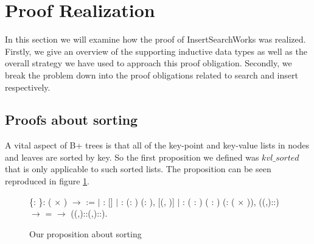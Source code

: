 \section{Proof Realization}
\label{sec:ProofRealization}
In this section we will examine how the proof of InsertSearchWorks was realized. Firstly, we give an overview of the supporting inductive data types as well as the overall strategy we have used to approach this proof obligation. Secondly, we break the problem down into the proof obligations related to search and insert respectively. 

\subsection{Proofs about sorting}
A vital aspect of B+ trees is that all of the key-point and key-value lists in nodes and leaves are sorted by key. So the first proposition we defined was $kvl\_sorted$ that is only applicable to such sorted lists. The proposition can be seen reproduced in figure \ref{fig:kvl_sorted}.

\begin{figure}
  \begin{coqdoccode}
  \coqdocnoindent
    \{: \}:  ( \ensuremath{\times} ) \ensuremath{\rightarrow}  :=\coqdoceol
  \coqdocindent{1.00em}
  \ensuremath{|}
  :  []\coqdoceol
  \coqdocindent{1.00em}
  \ensuremath{|} : \coqdockw{\ensuremath{\forall}} (: ) (: ), \coqdoceol
  \coqdocindent{8.00em}
   [(, )]\coqdoceol
  \coqdocindent{1.00em}
  \ensuremath{|} : \coqdockw{\ensuremath{\forall}} ( : ) ( : ) (:  ( \ensuremath{\times} )), \coqdoceol
  \coqdocindent{8.00em}
   ((,)::) \ensuremath{\rightarrow} \coqdoceol
  \coqdocindent{8.00em}
     =  \ensuremath{\rightarrow}\coqdoceol
  \coqdocindent{8.00em}
   ((,)::(,)::).\coqdoceol
  \end{coqdoccode}
  \caption{Our proposition about sorting}
  \label{fig:kvl_sorted}
\end{figure}

